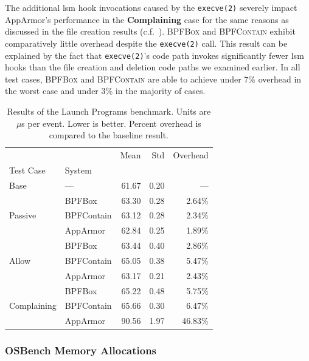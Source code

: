 \documentclass[
  fontsize=12pt,
  titlepage=firstiscover,
  paper=letter,
oneside,
  cleardoublepage=plain,
  parskip=half-,
  DIV=10,
  parindent,
  appendixprefix,
  chapterprefix,
  listof=totoc,
]{scrbook}
\newcommand{\bpfbox}{\textsc{BPFBox}}
\newcommand{\bpfcontain}{\textsc{BPFContain}}
\begin{document}
The additional \gls{lsm} hook invocations caused by the \texttt{execve(2)} severely impact
AppArmor's performance in the \textbf{Complaining} case for the same reasons as discussed
in the file creation results (c.f.\ ). \bpfbox{} and \bpfcontain{}
exhibit comparatively little overhead despite the \texttt{execve(2)} call. This result
can be explained by the fact that \texttt{execve(2)}'s code path invokes significantly
fewer \gls{lsm} hooks than the file creation and deletion code paths we examined earlier.
In all test cases, \bpfbox{} and \bpfcontain{} are able to achieve under $7\%$ overhead in
the worst case and under $3\%$ in the majority of cases.



\begin{table}[ht!]
\centering
\footnotesize
\caption[Results of the Launch Programs benchmark]{Results of the Launch Programs benchmark. Units are $\mu$s per event. Lower is better. Percent overhead is compared to the baseline result.}
\label{tab:phoronix-launch-programs}
\begin{tabular}{llrrr}
\toprule
            &          &   Mean &   Std & Overhead \\
Test Case & System &        &       &          \\
\midrule
Base & --- &  61.67 &  0.20 &      --- \\
\cline{1-5}
\multirow{3}{*}{Passive} & BPFBox &  63.30 &  0.28 &   2.64\% \\
            & BPFContain &  63.12 &  0.28 &   2.34\% \\
            & AppArmor &  62.84 &  0.25 &   1.89\% \\
\cline{1-5}
\multirow{3}{*}{Allow} & BPFBox &  63.44 &  0.40 &   2.86\% \\
            & BPFContain &  65.05 &  0.38 &   5.47\% \\
            & AppArmor &  63.17 &  0.21 &   2.43\% \\
\cline{1-5}
\multirow{3}{*}{Complaining} & BPFBox &  65.22 &  0.48 &   5.75\% \\
            & BPFContain &  65.66 &  0.30 &   6.47\% \\
            & AppArmor &  90.56 &  1.97 &  46.83\% \\
\bottomrule
\end{tabular}
\end{table}
 

\subsubsection{OSBench Memory Allocations}
\end{document}

